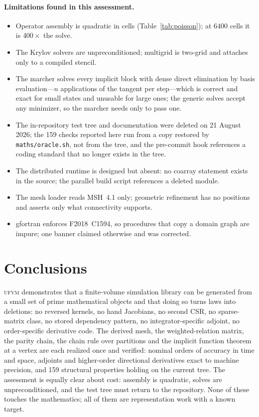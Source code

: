 \documentclass[11pt,a4paper]{article}
\newcommand{\code}[1]{\texttt{#1}}
\newcommand{\ufvm}{\textsc{ufvm}}
\begin{document}
\paragraph{Limitations found in this assessment.}
\begin{itemize}[nosep]
\item Operator assembly is quadratic in cells (Table~\ref{tab:poisson}); at $6400$ cells it is $400\times$ the solve.
\item The Krylov solvers are unpreconditioned; multigrid is two-grid and attaches only to a compiled stencil.
\item The marcher solves every implicit block with dense direct elimination by basis evaluation---$n$ applications of the tangent per step---which is correct and exact for small states and unusable for large ones; the generic solves accept any minimizer, so the marcher needs only to pass one.
\item The in-repository test tree and documentation were deleted on 21 August 2026; the 159 checks reported here run from a copy restored by \code{maths/oracle.sh}, not from the tree, and the pre-commit hook references a coding standard that no longer exists in the tree.
\item The distributed runtime is designed but absent: no coarray statement exists in the source; the parallel build script references a deleted module.
\item The mesh loader reads MSH~4.1 only; geometric refinement has no positions and asserts only what connectivity supports.
\item gfortran enforces F2018~C1594, so procedures that copy a domain graph are impure; one banner claimed otherwise and was corrected.
\end{itemize}

\section{Conclusions}\label{sec:conclusions}

\ufvm{} demonstrates that a finite-volume simulation library can be generated from a small set of prime mathematical objects and that doing so turns laws into deletions: no reversed kernels, no hand Jacobians, no second CSR, no sparse-matrix class, no stored dependency pattern, no integrator-specific adjoint, no order-specific derivative code. The derived mesh, the weighted-relation matrix, the parity chain, the chain rule over partitions and the implicit function theorem at a vertex are each realized once and verified: nominal orders of accuracy in time and space, adjoints and higher-order directional derivatives exact to machine precision, and 159 structural properties holding on the current tree. The assessment is equally clear about cost: assembly is quadratic, solves are unpreconditioned, and the test tree must return to the repository. None of these touches the mathematics; all of them are representation work with a known target.
\end{document}
